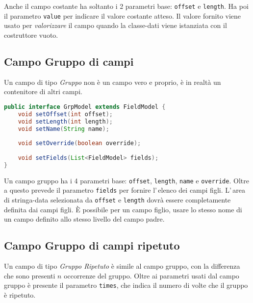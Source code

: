 \documentclass[a4paper,10pt]{report}
\begin{document}
Anche il campo costante ha soltanto i 2 parametri base: \verb!offset! e 
\verb!length!.
Ha poi il parametro \verb!value! per indicare il valore costante atteso.
Il valore fornito viene usato per \textit{valorizzare} il campo quando la 
classe-dati viene istanziata con il costruttore vuoto.

\subsection{Campo Gruppo di campi}
Un campo di tipo \textsl{Gruppo} non è un campo vero e proprio, è in realtà un
contenitore di altri campi.

\begin{figure*}[!htb]
\begin{lstlisting}[language=java, 
caption=interfaccia GrpModel (campo gruppo), 
label=lst:GrpModel]
public interface GrpModel extends FieldModel {
    void setOffset(int offset);
    void setLength(int length);
    void setName(String name);
    
    void setOverride(boolean override);
    
    void setFields(List<FieldModel> fields);
}
\end{lstlisting}
\end{figure*}

Un campo gruppo ha i 4 parametri base: \verb!offset!, \verb!length!, 
\verb!name! e \verb!override!.
Oltre a questo prevede il parametro \verb!fields! per fornire l'\,elenco dei 
campi figli.
L'\,area di stringa-data selezionata da \verb!offset! e \verb!length! dovrà
essere completamente definita dai campi figli.
È possibile per un campo figlio, usare lo stesso nome di un campo definito
allo stesso livello del campo padre. 

\subsection{Campo Gruppo di campi ripetuto}
Un campo di tipo \textsl{Gruppo Ripetuto} è simile al campo gruppo, con la 
differenza che sono presenti $n$ occorrenze del gruppo.
Oltre ai parametri usati dal campo gruppo è presente il parametro \verb!times!,
che indica il numero di volte che il gruppo è ripetuto.
\end{document}
